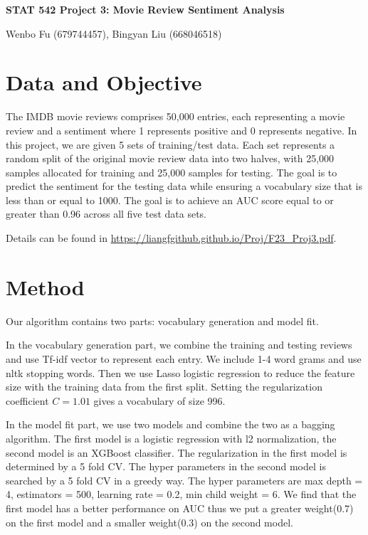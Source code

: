 \documentclass[12pt]{article}
\theoremstyle{plain}
\renewcommand{\title}[1]{\vbox{\center\bf{\Large{#1}}}\vspace{5mm}}
\renewcommand{\author}[1]{\vbox{\center#1}\vspace{5mm}}
\begin{document}
\begin{center}
\title{STAT 542 Project 3: Movie Review Sentiment Analysis}

\author{Wenbo Fu (679744457), Bingyan Liu (668046518)}

\end{center}
  

\baselineskip=17.63pt 


\section{Data and Objective}

The IMDB movie reviews comprises 50,000 entries, each representing a movie review and a sentiment where 1 represents positive and 0 represents negative. In this project, we are given 5 sets of training/test data. Each set represents a random split of the original movie review data into two halves, with 25,000 samples allocated for training and 25,000 samples for testing. The goal is to predict the sentiment for the testing data while ensuring a vocabulary size that is less than or equal to 1000. The goal is to achieve an AUC score equal to or greater than 0.96 across all five test data sets.

Details can be found in \url{https://liangfgithub.github.io/Proj/F23_Proj3.pdf}. 

\section{Method}
Our algorithm contains two parts: vocabulary generation and model fit. 

In the vocabulary generation part, we combine the training and testing reviews and use Tf-idf vector to  represent each entry. We include 1-4 word grams and use nltk stopping words. Then we use Lasso logistic regression to reduce the feature size with the training data from the first split. Setting the regularization coefficient $C=1.01$ gives a vocabulary of size 996.

In the model fit part, we use two models and combine the two as a bagging algorithm. The first model is a logistic regression with l2 normalization, the second model is an XGBoost classifier. The regularization in the first model is determined by a 5 fold CV. The hyper parameters in the second model is searched by a 5 fold CV in a greedy way. The hyper parameters are max depth = 4, estimators = 500, learning rate = 0.2, min child weight = 6. We find that the first model has a better performance on AUC thus we put a greater weight(0.7) on the first model and a smaller weight(0.3) on the second model.
\end{document}
